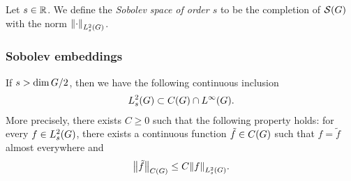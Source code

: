 \begin{definition}
\label{definition:Sobolev_spaces}
    Let $s \in \R$.
    We define the \emph{Sobolev space of order $s$} to be the completion of $\Schwartz\Group$ with the norm $\norm[\Sobolev{s}]{\dummy}$.
\end{definition}

\subsubsection{Sobolev embeddings}

\begin{proposition}
\label{proposition:Sobolev_embedding}
    If $s > \dim \Group / 2$, then we have the following continuous inclusion
    \begin{align*}
        \Sobolev{s} \subset \ContinuousFunctions\Group \cap \Lebesgue{\infty}{\Group}.
    \end{align*}
    More precisely, there exists $C \geq 0$ such that the following property holds:
    for every $f \in \Sobolev{s}$,
    there exists a continuous function $\tilde{f} \in \ContinuousFunctions\Group$ such that $f = \tilde{f}$ almost everywhere and
    \begin{align*}
        \norm[\ContinuousFunctions\Group]{\tilde{f}} \leq C \norm[\Sobolev{s}]{f}.
    \end{align*}
\end{proposition}

